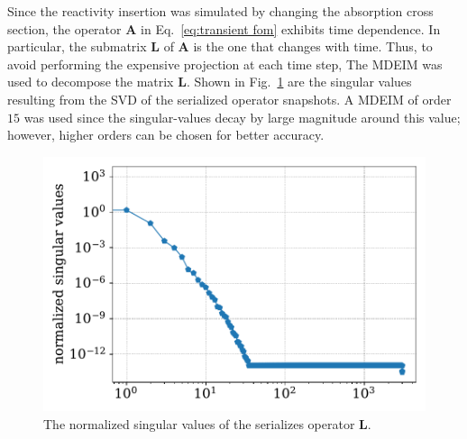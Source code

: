 \documentclass[review,number,sort&compress,12pt]{elsarticle}
\begin{document}
Since the reactivity insertion was simulated by changing the absorption cross section, the operator $\mathbf{A}$ in Eq.~\ref{eq:transient fom} exhibits time dependence.
In particular, the submatrix $\mathbf{L}$ of $\mathbf{A}$ is the one that changes with time.
Thus, to avoid performing the expensive projection at each time step, 
The MDEIM was used to decompose the matrix $\mathbf{L}$.
Shown in Fig.~\ref{fig:lra L singular values} are the singular values resulting from the SVD of the serialized operator snapshots. 
A MDEIM of order $15$ was used since the singular-values decay by large magnitude around this value; however, higher orders can be chosen for better accuracy.

\begin{figure}[H]
	\includegraphics[width=1.0\linewidth]{../figures/LRA_L_singular_values.pdf}
	\caption{The normalized singular values of the serializes operator $\mathbf{L}$.}
	\label{fig:lra L singular values}
\end{figure}

\end{document}
